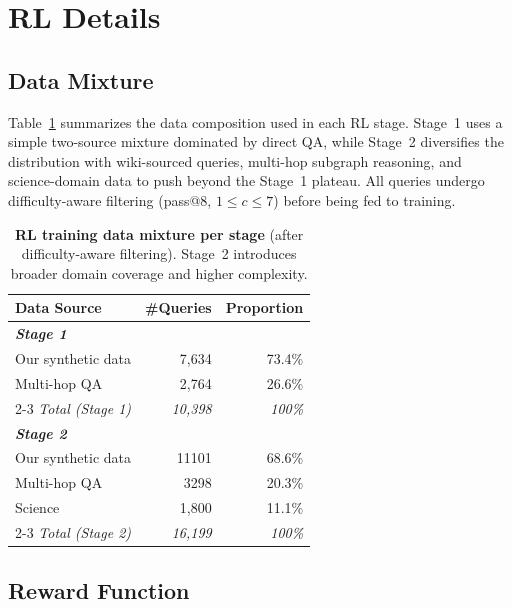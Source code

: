 \documentclass{article} %
\theoremstyle{plain}
\theoremstyle{definition}
\theoremstyle{remark}
\begin{document}
\section{RL Details}
\label{sec:app_rl}

\subsection{Data Mixture}

Table~\ref{tab:rl_data_mixture} summarizes the data composition used in each RL stage. Stage~1 uses a simple two-source mixture dominated by direct QA, while Stage~2 diversifies the distribution with wiki-sourced queries, multi-hop subgraph reasoning, and science-domain data to push beyond the Stage~1 plateau. All queries undergo difficulty-aware filtering (pass@8, $1 \le c \le 7$) before being fed to training.

\begin{table}[H]
    \centering
    \small
    \setlength{\tabcolsep}{6pt}
    \renewcommand{\arraystretch}{1.1}
    \begin{tabular}{lrr}
        \toprule
        \textbf{Data Source} & \textbf{\#Queries} & \textbf{Proportion} \\
        \midrule
        \multicolumn{3}{l}{\textit{\textbf{Stage 1}}} \\
        Our synthetic data & 7,634 & 73.4\% \\
        Multi-hop QA & 2,764 & 26.6\% \\
        \cmidrule{2-3}
        \textit{Total (Stage 1)} & \textit{10,398} & \textit{100\%} \\
        \midrule
        \multicolumn{3}{l}{\textit{\textbf{Stage 2}}} \\
        Our synthetic data & 11101 & 68.6\% \\
        Multi-hop QA & 3298 & 20.3\% \\
        Science~\citep{fan2025megascience} & 1,800 & 11.1\% \\
        \cmidrule{2-3}
        \textit{Total (Stage 2)} & \textit{16,199} & \textit{100\%} \\
        \bottomrule
    \end{tabular}
    \caption{\textbf{RL training data mixture per stage} (after difficulty-aware filtering). Stage~2 introduces broader domain coverage and higher complexity.}
    \label{tab:rl_data_mixture}
\end{table}

\subsection{Reward Function}
\label{sec:reward_prompt}
\end{document}
